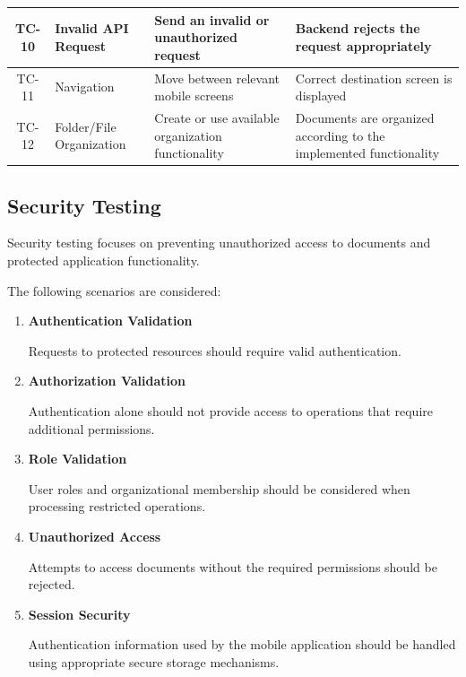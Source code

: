 \documentclass[12pt]{article}
\begin{document}
\begin{table}[H]
\begin{tabular}{|c|p{3.0cm}|p{4.0cm}|p{5.3cm}|}
TC-10 &
Invalid API Request &
Send an invalid or unauthorized request &
Backend rejects the request appropriately \\ \hline

TC-11 &
Navigation &
Move between relevant mobile screens &
Correct destination screen is displayed \\ \hline

TC-12 &
Folder/File Organization &
Create or use available organization functionality &
Documents are organized according to the implemented functionality \\ \hline

\end{tabular}
\end{table}


\subsection{Security Testing}

Security testing focuses on preventing unauthorized access to documents and protected application functionality.

The following scenarios are considered:

\begin{enumerate}

    \item \textbf{Authentication Validation}

    Requests to protected resources should require valid authentication.

    \item \textbf{Authorization Validation}

    Authentication alone should not provide access to operations that require additional permissions.

    \item \textbf{Role Validation}

    User roles and organizational membership should be considered when processing restricted operations.

    \item \textbf{Unauthorized Access}

    Attempts to access documents without the required permissions should be rejected.

    \item \textbf{Session Security}

    Authentication information used by the mobile application should be handled using appropriate secure storage mechanisms.

\end{enumerate}
\end{document}

